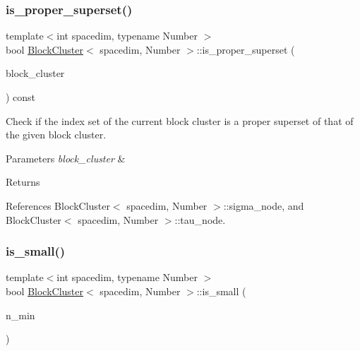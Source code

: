 \mbox{\label{classBlockCluster_ad81d5a494f48b16662ef471966899b65}} 
\subsubsection{\texorpdfstring{is\+\_\+proper\+\_\+superset()}{is\_proper\_superset()}}
{\footnotesize\ttfamily template$<$int spacedim, typename Number $>$ \\
bool \hyperlink{classBlockCluster}{Block\+Cluster}$<$ spacedim, Number $>$\+::is\+\_\+proper\+\_\+superset (\begin{DoxyParamCaption}\item[{const \hyperlink{classBlockCluster}{Block\+Cluster}$<$ spacedim, Number $>$ \&}]{block\+\_\+cluster }\end{DoxyParamCaption}) const}

Check if the index set of the current block cluster is a proper superset of that of the given block cluster. 
\begin{DoxyParams}{Parameters}
{\em block\+\_\+cluster} & \\
\hline
\end{DoxyParams}
\begin{DoxyReturn}{Returns}

\end{DoxyReturn}


References Block\+Cluster$<$ spacedim, Number $>$\+::sigma\+\_\+node, and Block\+Cluster$<$ spacedim, Number $>$\+::tau\+\_\+node.

\mbox{\label{classBlockCluster_adb6edc09ec2c579677e0532644b9f57d}} 
\subsubsection{\texorpdfstring{is\+\_\+small()}{is\_small()}}
{\footnotesize\ttfamily template$<$int spacedim, typename Number $>$ \\
bool \hyperlink{classBlockCluster}{Block\+Cluster}$<$ spacedim, Number $>$\+::is\+\_\+small (\begin{DoxyParamCaption}\item[{unsigned int}]{n\+\_\+min }\end{DoxyParamCaption})}

